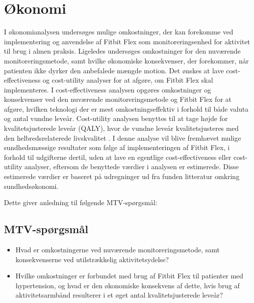 \section{Økonomi}\label{sec:metode_oeko}
I økonomianalysen undersøges mulige omkostninger, der kan forekomme ved implementering og anvendelse af Fitbit Flex som monitoreringsenhed for aktivitet til brug i almen praksis.
Ligeledes undersøges omkostninger for den nuværende monitoreringsmetode, samt hvilke økonomiske konsekvenser, der forekommer, når patienten ikke dyrker den anbefalede mængde motion.
Det ønskes at lave cost-effectiveness og cost-utility analyser for at afgøre, om Fitbit Flex skal implementeres. I cost-effectiveness analysen opgøres omkostninger og konsekvenser ved den nuværende monitoreringsmetode og Fitbit Flex for at afgøre, hvilken teknologi der er mest omkostningseffektiv i forhold til både valuta og antal vundne leveår. Cost-utility analysen benyttes til at tage højde for kvalitetsjusterede leveår (QALY), hvor de vundne leveår kvalitetsjusteres med den helbredsrelaterede livskvalitet \citep{mtvhaandbog}.
I denne analyse vil blive fremhævet mulige sundhedsmæssige resultater som følge af implementeringen af Fitbit Flex, i forhold til udgifterne dertil, uden at lave en egentlige cost-effectiveness eller cost-utility analyser, eftersom de benyttede værdier i analysen er estimerede.  
Disse estimerede værdier er baseret på udregninger ud fra funden litteratur omkring sundhedsøkonomi.

\noindent
Dette giver anledning til følgende MTV-spørgsmål: 

\subsection{MTV-spørgsmål}
 
\begin{itemize}
\item Hvad er omkostningerne ved nuværende monitoreringsmetode, samt konsekvenserne ved utilstrækkelig aktivitetsydelse? 
\item Hvilke omkostninger er forbundet med brug af Fitbit Flex til patienter med hypertension, og hvad er den økonomiske konsekvens af dette, hvis brug af aktivitetsarmbånd resulterer i et øget antal kvalitetsjusterede leveår?
\end{itemize}


